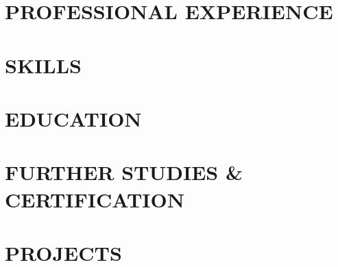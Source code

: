 \documentclass[12pt, letterpaper]{report}
\begin{document}
\paperHeader
\vspace{-.8cm}
\section{\faBriefcase \space PROFESSIONAL EXPERIENCE}
\resumeSubHeadingList
\treon
\tampere
\nokia
\resumeSubHeadingListEnd
\vspace{-.8cm}
\newlength{\rowSpace}
\setlength{\rowSpace}{1.8mm}
\section{\faPuzzlePiece\space SKILLS}
\generalSkills
\vspace{-.6cm}
\section{\faGraduationCap\space EDUCATION}
\resumeSubHeadingList
\eduTampere
\eduNodet
\resumeSubHeadingListEnd
\section{\faBook\space FURTHER STUDIES \& CERTIFICATION}
\certGeneral
\pagebreak
\section{\faFolderOpen\space PROJECTS}
\projectJobSearch
\logLyfe
\secondSight
\blockChain
\rqm
\codeShare
\hyperLink
\end{document}
